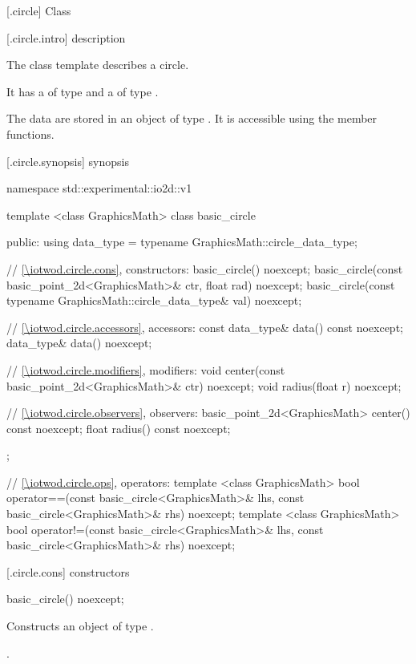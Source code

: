  [\iotwod.circle] {Class }

 [\iotwod.circle.intro] { description}

\pnum
{}%
The class template  describes a circle.

\pnum
It has a  of type  and a  of type .

\pnum
The data are stored in an object of type . It is accessible using the  member functions.

 [\iotwod.circle.synopsis] { synopsis}

\begin{codeblock}
namespace std::experimental::io2d::v1 {
  template <class GraphicsMath>
  class basic_circle {
  public:
    using data_type = typename GraphicsMath::circle_data_type;
    
    // \ref{\iotwod.circle.cons}, constructors:
    basic_circle() noexcept;
    basic_circle(const basic_point_2d<GraphicsMath>& ctr, float rad) noexcept;
    basic_circle(const typename GraphicsMath::circle_data_type& val) noexcept;

    // \ref{\iotwod.circle.accessors}, accessors:
    const data_type& data() const noexcept;
    data_type& data() noexcept;

    // \ref{\iotwod.circle.modifiers}, modifiers:
    void center(const basic_point_2d<GraphicsMath>& ctr) noexcept;
    void radius(float r) noexcept;

    // \ref{\iotwod.circle.observers}, observers:
    basic_point_2d<GraphicsMath> center() const noexcept;
    float radius() const noexcept;
  };

  // \ref{\iotwod.circle.ops}, operators:
  template <class GraphicsMath>
  bool operator==(const basic_circle<GraphicsMath>& lhs,
    const basic_circle<GraphicsMath>& rhs) noexcept;
  template <class GraphicsMath>
  bool operator!=(const basic_circle<GraphicsMath>& lhs,
    const basic_circle<GraphicsMath>& rhs) noexcept;
}
\end{codeblock}

 [\iotwod.circle.cons] { constructors}

%
\begin{itemdecl}
basic_circle() noexcept;
\end{itemdecl}
\begin{itemdescr}
\pnum
\effects
Constructs an object of type .

\pnum
\postconditions
{}.
\end{itemdescr}

